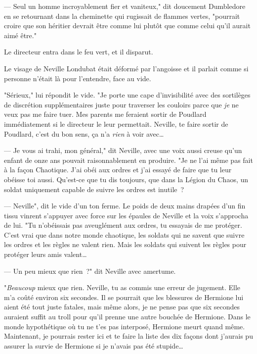 --- Seul un homme incroyablement fier et vaniteux," dit doucement Dumbledore en se retournant dans la cheminette qui rugissait de flammes vertes, "pourrait croire que son héritier devrait être comme lui plutôt que comme celui qu'il aurait aimé être."

Le directeur entra dans le feu vert, et il disparut.


Le visage de Neville Londubat était déformé par l'angoisse et il parlait comme si personne n'était là pour l'entendre, face au vide.

"Sérieux," lui répondit le vide. "Je porte une cape d'invisibilité avec des sortilèges de discrétion supplémentaires juste pour traverser les couloirs parce que \emph{je} ne veux pas me faire tuer. Mes parents me feraient sortir de Poudlard immédiatement si le directeur le leur permettait. Neville, te faire sortir de Poudlard, c'est du bon sens, ça n'a \emph{rien} à voir avec…

--- Je vous ai trahi, mon général," dit Neville, avec une voix aussi creuse qu'un enfant de onze ans pouvait raisonnablement en produire. "Je ne l'ai même pas fait à la façon Chaotique. J'ai obéi aux ordres et j'ai essayé de faire que tu leur obéisse toi aussi. Qu'est-ce que tu dis toujours, que dans la Légion du Chaos, un soldat uniquement capable de suivre les ordres est inutile~?

--- Neville", dit le vide d'un ton ferme. Le poids de deux mains drapées d'un fin tissu vinrent s'appuyer avec force sur les épaules de Neville et la voix s'approcha de lui. "Tu n'obéissais pas aveuglément aux ordres, tu essayais de me protéger. C'est vrai que dans notre monde chaotique, les soldats qui ne savent que suivre les ordres et les règles ne valent rien. Mais les soldats qui suivent les règles pour protéger leurs amis valent…

--- Un peu mieux que rien~?" dit Neville avec amertume.

"\emph{Beaucoup} mieux que rien. Neville, tu as commis une erreur de jugement. Elle m'a coûté environ six secondes. Il se pourrait que les blessures de Hermione lui aient été tout juste fatales, mais même alors, je ne pense pas que six secondes auraient suffit au troll pour qu'il prenne une autre bouchée de Hermione. Dans le monde hypothétique où tu ne t'es pas interposé, Hermione meurt quand même. Maintenant, je pourrais rester ici et te faire la liste des dix façons dont j'aurais pu assurer la survie de Hermione si je n'avais pas été stupide…

